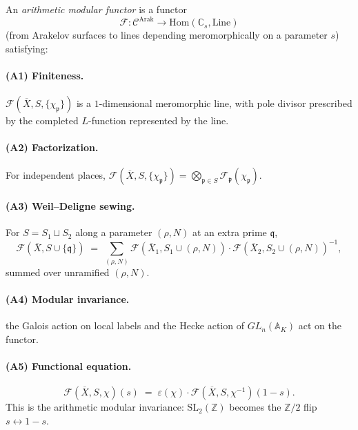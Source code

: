 \begin{definition}
\label{v4-arith:def:arithmetic-modular-functor}
An \emph{arithmetic modular functor} is a functor
\begin{equation*}
\mathcal{F}\colon\mathcal{C}^{\mathrm{Arak}}\to\mathrm{Hom}(\mathbb{C}_{s},\mathrm{Line})
\end{equation*}
(from Arakelov surfaces to lines depending meromorphically on a
parameter \(s\)) satisfying:

\paragraph{(A1) Finiteness.} \(\mathcal{F}(\overline{X},S,\{\chi_{\mathfrak{p}}\})\)
is a \(1\)-dimensional meromorphic line, with pole divisor prescribed by
the completed \(L\)-function represented by the line.

\paragraph{(A2) Factorization.} For independent places,
\(\mathcal{F}(\overline{X},S,\{\chi_{\mathfrak{p}}\})=\bigotimes_{\mathfrak{p}\in S}\mathcal{F}_{\mathfrak{p}}(\chi_{\mathfrak{p}})\).

\paragraph{(A3) Weil--Deligne sewing.} For \(S=S_{1}\sqcup S_{2}\)
along a parameter \((\rho,N)\) at an extra prime \(\mathfrak{q}\),
\begin{equation*}
\mathcal{F}(\overline{X},S\cup\{\mathfrak{q}\})\;=\;\sum_{(\rho,N)}
\mathcal{F}(\overline{X}_{1},S_{1}\cup(\rho,N))\cdot
\mathcal{F}(\overline{X}_{2},S_{2}\cup(\rho,N))^{-1},
\end{equation*}
summed over unramified \((\rho,N)\).

\paragraph{(A4) Modular invariance.}
the Galois action on local labels and the Hecke action of
\(GL_{n}(\mathbb{A}_{K})\) act on the functor.

\paragraph{(A5) Functional equation.}
\begin{equation*}
\mathcal{F}(\overline{X},S,\chi)(s)\;=\;\varepsilon(\chi)\cdot\mathcal{F}(\overline{X},S,\chi^{-1})(1-s).
\end{equation*}
This is the arithmetic modular invariance: \(\mathrm{SL}_{2}(\mathbb{Z})\)
becomes the \(\mathbb{Z}/2\) flip \(s\leftrightarrow 1-s\).
\end{definition}

